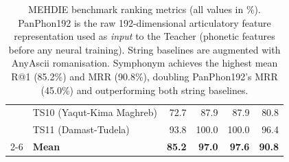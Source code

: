 \documentclass[11pt,a4paper]{article}
\begin{document}
\begin{table}[p]
\begin{tabular}{llrrrr}
& TS10 (Yaqut-Kima Maghreb) & 72.7 & 87.9 & 87.9 & 80.8 \\
& TS11 (Damast-Tudela) & 93.8 & 100.0 & 100.0 & 96.4 \\
\cmidrule{2-6}
& \textbf{Mean} & \textbf{85.2} & \textbf{97.0} & \textbf{97.6} & \textbf{90.8} \\
\bottomrule
\end{tabular}
\caption{MEHDIE benchmark ranking metrics (all values in \%). PanPhon192 is the raw 192-dimensional articulatory feature representation used as \emph{input} to the Teacher (phonetic features before any neural training). String baselines are augmented with AnyAscii romanisation. Symphonym achieves the highest mean R@1 (85.2\%) and MRR (90.8\%), doubling PanPhon192's MRR (45.0\%) and outperforming both string baselines.}
\label{tab:mehdie-ranking}
\end{table}
\end{document}
